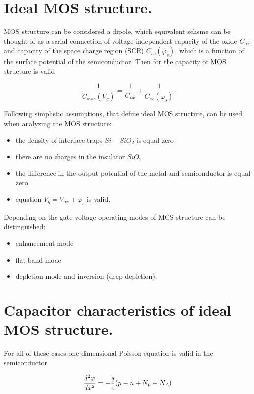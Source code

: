 \section{Ideal MOS structure.}

MOS structure can be considered a dipole, which equivalent scheme can
be thought of as a serial connection of voltage-independent capacity
of the oxide $C_{ox}$ and capacity of the space charge region (SCR)
$C_{sc}(\varphi_{s})$, which is a function of the surface potential of
the semiconductor. Then for the capacity of MOS structure is
valid~\cite{I.1}

\begin{equation}\label{eq:1.1}
  \frac{1}{C_{mos}(V_g)} = \frac{1}{C_{ox}} + \frac{1}{C_{sc}(\varphi_s)}
\end{equation}

Following simplistic assumptions, that define ideal MOS structure, can
be used when analyzing the MOS structure:

\begin{itemize}
\item the density of interface traps $Si-SiO_2$ is equal zero
\item there are no charges in the insulator $SiO_2$
\item the difference in the output potential of the metal and
  semiconductor is equal zero
\item equation $V_{g}=V_{ox}+\varphi_{s}$ is valid.
\end{itemize}

\noindent Depending on the gate voltage operating modes of MOS
structure can be distinguished:

\begin{itemize}
\item enhancement mode
\item flat band mode
\item depletion mode and inversion (deep depletion).
\end{itemize}

\section{Capacitor characteristics of ideal MOS structure.}

For all of these cases one-dimensional Poisson equation is valid in
the semiconductor

\begin{equation}\label{eq:1.2}\index{Poisson equation}
  \frac{d^2\varphi}{dx^2} = -\frac{q}{\varepsilon}(p-n+N_{p}-N_{A})
\end{equation}

